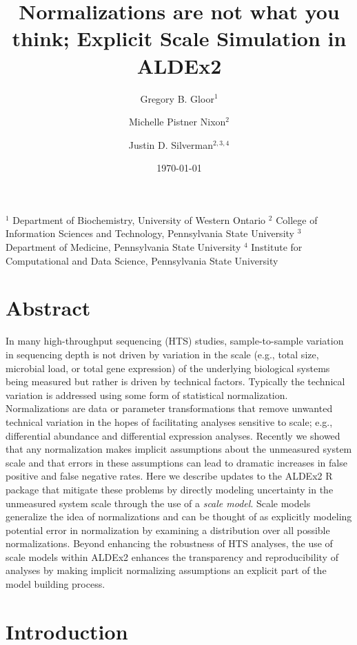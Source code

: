 \documentclass[
]{article}
\title{Normalizations are not what you think; Explicit Scale Simulation
in ALDEx2}
\author{Gregory B. Gloor$^1$ \and Michelle Pistner Nixon$^2$ \and Justin D. Silverman$^{2,3,4}$}
\date{\today}
\begin{document}
\maketitle

$^1$ Department of Biochemistry, University of Western Ontario
$^2$ College of Information Sciences and Technology, Pennsylvania  State University
$^3$ Department of Medicine, Pennsylvania  State University
$^4$ Institute for Computational and Data Science, Pennsylvania State University

\section{Abstract}\label{abstract}
In many high-throughput sequencing (HTS) studies, sample-to-sample
variation in sequencing depth is not driven by variation in the scale
(e.g., total size, microbial load, or total gene expression) of the
underlying biological systems being measured but rather is driven by
technical factors. Typically the technical variation is addressed using
some form of statistical normalization. Normalizations are data or
parameter transformations that remove unwanted technical variation in
the hopes of facilitating analyses sensitive to scale; e.g.,
differential abundance and differential expression analyses. Recently we
showed that any normalization makes implicit assumptions about the
unmeasured system scale and that errors in these assumptions can lead to
dramatic increases in false positive and false negative rates. Here we
describe updates to the ALDEx2 R package that mitigate these problems by
directly modeling uncertainty in the unmeasured system scale through the
use of a \textit{scale model}. Scale models generalize the idea of
normalizations and can be thought of as explicitly modeling potential
error in normalization by examining a distribution over all possible 
normalizations.  Beyond enhancing the robustness of HTS analyses, 
the use of scale models within ALDEx2 enhances the transparency and 
reproducibility of analyses by making implicit normalizing assumptions an 
explicit part of the model building process.

\hypertarget{introduction}{%
\section{Introduction}\label{introduction}}
\end{document}
